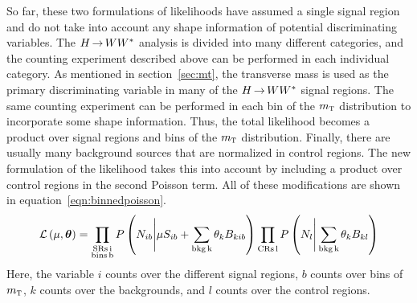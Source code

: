 So far, these two formulations of likelihoods have assumed a single signal region and do not take into account any shape information of potential discriminating variables. The $H{\,{\rightarrow}\,}WW^\ast$ analysis is divided into many different categories, and the counting experiment described above can be performed in each individual category. As mentioned in section~\ref{sec:mt}, the transverse mass is used as the primary discriminating variable in many of the $H{\,{\rightarrow}\,}WW^\ast$ signal regions. The same counting experiment can be performed in each bin of the $m_{\textrm{\footnotesize\sc t}}$ distribution to incorporate some shape information. Thus, the total likelihood becomes a product over signal regions and bins of the $m_{\textrm{\footnotesize\sc t}}$ distribution. Finally, there are usually many background sources that are normalized in control regions. The new formulation of the likelihood takes this into account by including a product over control regions in the second Poisson term. All of these modifications are shown in equation~\ref{eqn:binnedpoisson}. 
%
\begin{equation}
\mathcal{L}\left(\mu, \hbox{\bm{$\theta$}}\right) = \prod_{\substack{\rm{SRs }\, i \\ \rm{bins }\, b}} P\left(N_{ib} \Bigg| \mu S_{ib} + \sum_{\rm{bkg }\, k}\theta_{k} B_{kib}\right)
 \prod_{\substack{\rm{CRs} \, l}} P\left(N_{l} \Bigg| \sum_{\rm{bkg }\, k}\theta_{k} B_{kl}\right)
\label{eqn:binnedpoisson}
\end{equation}
%
Here, the variable $i$ counts over the different signal regions, $b$ counts over bins of $m_{\textrm{\footnotesize\sc t}}$, $k$ counts over the backgrounds, and $l$ counts over the control regions. 

